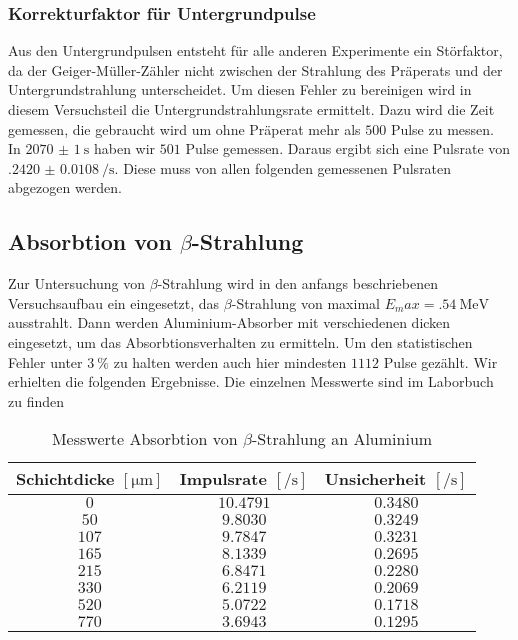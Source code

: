 \subsubsection{Korrekturfaktor für Untergrundpulse}
Aus den Untergrundpulsen entsteht für alle anderen Experimente ein Störfaktor, da der Geiger-Müller-Zähler nicht zwischen der Strahlung des Präperats und der Untergrundstrahlung unterscheidet. Um diesen Fehler zu bereinigen wird in diesem Versuchsteil die Untergrundstrahlungsrate ermittelt. Dazu wird die Zeit gemessen, die gebraucht wird um ohne Präperat mehr als $ 500 $ Pulse zu messen.\\
In $ \SI{2070(1)}{\second} $ haben wir $ 501 $ Pulse gemessen. Daraus ergibt sich eine Pulsrate von $ \SI{.2420(108)}{\per\second} $. Diese muss von allen folgenden gemessenen Pulsraten abgezogen werden.

\subsection{Absorbtion von $ \beta $-Strahlung}

Zur Untersuchung von $ \beta $-Strahlung wird in den anfangs beschriebenen Versuchsaufbau ein  eingesetzt, das $ \beta $-Strahlung von maximal $ E_max = \SI{.54}{\MeV} $ ausstrahlt. Dann werden Aluminium-Absorber mit verschiedenen dicken eingesetzt, um das Absorbtionsverhalten zu ermitteln. Um den statistischen Fehler unter $ \SI{3}{\percent} $ zu halten werden auch hier mindesten $ 1112 $ Pulse gezählt. Wir erhielten die folgenden Ergebnisse. Die einzelnen Messwerte sind im Laborbuch zu finden

\begin{table}[h!]
\centering
\begin{tabular}{c|c|c}
Schichtdicke $ [\si{\micro\meter}] $ & Impulsrate $ [\si{\per\second}] $ & Unsicherheit $ [\si{\per\second}] $ \\\hline
$ 0 $ & $ \num{10.4791} $ & $ \num{0.3480} $ \\ 
$ 50 $ & $ \num{9.8030} $ & $ \num{0.3249} $ \\
$ 107 $ & $ \num{9.7847} $ & $ \num{0.3231} $ \\
$ 165 $ & $ \num{8.1339} $ & $ \num{0.2695} $ \\
$ 215 $ & $ \num{6.8471} $ & $ \num{0.2280} $ \\
$ 330 $ & $ \num{6.2119} $ & $ \num{0.2069} $ \\
$ 520 $ & $ \num{5.0722} $ & $ \num{0.1718} $ \\
$ 770 $ & $ \num{3.6943} $ & $ \num{0.1295} $
\end{tabular}
\caption{Messwerte Absorbtion von $ \beta $-Strahlung an Aluminium}
\label{tab:abs_alu}
\end{table}

